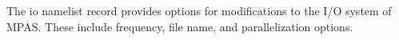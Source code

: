 The io namelist record provides options for modifications to the I/O system of
MPAS. These include frequency, file name, and parallelization options.
